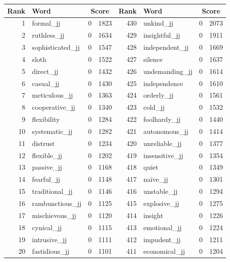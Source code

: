 \begin{table}[tbp]
    \begin{tabular}{| rlr@{.}l | rlr@{.}l |}
    \hline
    \textbf{Rank} & \textbf{Word} & \multicolumn{2}{c|}{\textbf{Score}} & \textbf{Rank} & \textbf{Word} & \multicolumn{2}{c|}{\textbf{Score}} \\
    \hline
    1 & formal\_jj & 0 & 1823    &    430 & unkind\_jj & 0 & 2073 \\
    2 & ruthless\_jj & 0 & 1634    &    429 & insightful\_jj & 0 & 1911 \\
    3 & sophisticated\_jj & 0 & 1547    &    428 & independent\_jj & 0 & 1669 \\
    4 & sloth & 0 & 1522    &    427 & silence & 0 & 1637 \\
    5 & direct\_jj & 0 & 1432    &    426 & undemanding\_jj & 0 & 1614 \\
    6 & casual\_jj & 0 & 1430    &    425 & independence & 0 & 1610 \\
    7 & meticulous\_jj & 0 & 1363    &    424 & orderly\_jj & 0 & 1561 \\
    8 & cooperative\_jj & 0 & 1340    &    423 & cold\_jj & 0 & 1532 \\
    9 & flexibility & 0 & 1284    &    422 & foolhardy\_jj & 0 & 1440 \\
    10 & systematic\_jj & 0 & 1282    &    421 & autonomous\_jj & 0 & 1414 \\
    11 & distrust & 0 & 1234    &    420 & unreliable\_jj & 0 & 1377 \\
    12 & flexible\_jj & 0 & 1202    &    419 & insensitive\_jj & 0 & 1354 \\
    13 & passive\_jj & 0 & 1168    &    418 & quiet & 0 & 1349 \\
    14 & fearful\_jj & 0 & 1148    &    417 & naïve\_jj & 0 & 1301 \\
    15 & traditional\_jj & 0 & 1146    &    416 & unstable\_jj & 0 & 1294 \\
    16 & rambunctious\_jj & 0 & 1125    &    415 & explosive\_jj & 0 & 1275 \\
    17 & mischievous\_jj & 0 & 1120    &    414 & insight & 0 & 1226 \\
    18 & cynical\_jj & 0 & 1115    &    413 & emotional\_jj & 0 & 1224 \\
    19 & intrusive\_jj & 0 & 1111    &    412 & impudent\_jj & 0 & 1211 \\
    20 & fastidious\_jj & 0 & 1101    &    411 & economical\_jj & 0 & 1204 \\

\end{tabular}
\end{table}
